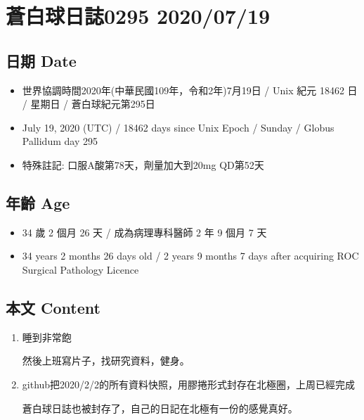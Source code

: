\documentclass[a5paper, 11pt
]{book}
\providecommand{\tightlist}{%
  \setlength{\itemsep}{0pt}\setlength{\parskip}{0pt}}
\begin{document}
\hypertarget{ux84bcux767dux7403ux65e5ux8a8c0295-20200719}{%
\section{蒼白球日誌0295
2020/07/19}\label{ux84bcux767dux7403ux65e5ux8a8c0295-20200719}}

\hypertarget{ux65e5ux671f-date-48}{%
\subsection{日期 Date}\label{ux65e5ux671f-date-48}}

\begin{itemize}
\tightlist
\item
  世界協調時間2020年(中華民國109年，令和2年)7月19日 / Unix 紀元 18462 日
  / 星期日 / 蒼白球紀元第295日
\item
  July 19, 2020 (UTC) / 18462 days since Unix Epoch / Sunday / Globus
  Pallidum day 295
\item
  特殊註記: 口服A酸第78天，劑量加大到20mg QD第52天
\end{itemize}

\hypertarget{ux5e74ux9f61-age-48}{%
\subsection{年齡 Age}\label{ux5e74ux9f61-age-48}}

\begin{itemize}
\tightlist
\item
  34 歲 2 個月 26 天 / 成為病理專科醫師 2 年 9 個月 7 天
\item
  34 years 2 months 26 days old / 2 years 9 months 7 days after
  acquiring ROC Surgical Pathology Licence
\end{itemize}

\hypertarget{ux672cux6587-content-48}{%
\subsection{本文 Content}\label{ux672cux6587-content-48}}

\begin{enumerate}
\def\labelenumi{\arabic{enumi}.}
\item
  睡到非常飽

  然後上班寫片子，找研究資料，健身。
\item
  github把2020/2/2的所有資料快照，用膠捲形式封存在北極圈，上周已經完成

  蒼白球日誌也被封存了，自己的日記在北極有一份的感覺真好。
\end{enumerate}
\end{document}
